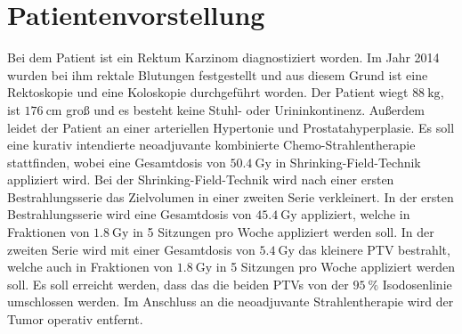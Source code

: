 \section{Patientenvorstellung}
\label{sec:Durchführung}
Bei dem Patient ist ein Rektum Karzinom diagnostiziert worden.
Im Jahr 2014 wurden bei ihm rektale Blutungen festgestellt und aus diesem Grund ist eine
Rektoskopie und eine Koloskopie durchgeführt worden.
Der Patient wiegt $\SI{88}{\kilogram}$, ist $\SI{176}{\centi\meter}$ groß und es besteht keine Stuhl- oder Urininkontinenz.
Außerdem leidet der Patient an einer arteriellen Hypertonie und Prostatahyperplasie.
Es soll eine kurativ intendierte neoadjuvante kombinierte Chemo-Strahlentherapie stattfinden,
wobei eine Gesamtdosis von $\SI{50,4}{\gray}$ in
Shrinking-Field-Technik appliziert wird.
Bei der Shrinking-Field-Technik wird nach einer ersten Bestrahlungsserie das Zielvolumen in einer zweiten Serie verkleinert.
In der ersten Bestrahlungsserie wird eine Gesamtdosis von $\SI{45,4}{\gray}$ appliziert,
welche in Fraktionen von $\SI{1,8}{\gray}$ in 5 Sitzungen pro Woche appliziert werden soll.
In der zweiten Serie wird mit einer Gesamtdosis von $\SI{5,4}{\gray}$ das kleinere PTV bestrahlt,
welche auch in Fraktionen von $\SI{1,8}{\gray}$ in 5 Sitzungen pro Woche appliziert werden soll.
Es soll erreicht werden, dass das die beiden PTVs von der $\SI{95}{\percent}$ Isodosenlinie umschlossen werden.
Im Anschluss an die neoadjuvante Strahlentherapie wird der Tumor operativ entfernt.
